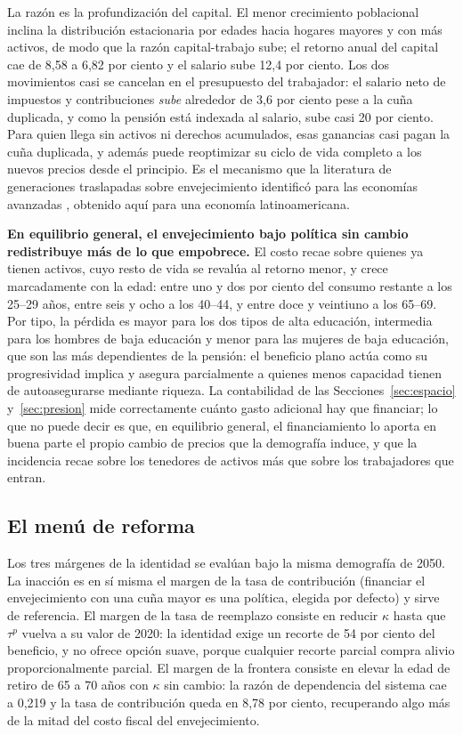 \documentclass[12pt, letterpaper]{article}
\begin{document}
La razón es la profundización del capital. El menor crecimiento poblacional
inclina la distribución estacionaria por edades hacia hogares mayores y con más
activos, de modo que la razón capital-trabajo sube; el retorno anual del capital
cae de 8,58 a 6,82 por ciento y el salario sube 12,4 por ciento. Los dos
movimientos casi se cancelan en el presupuesto del trabajador: el salario neto de
impuestos y contribuciones \emph{sube} alrededor de 3,6 por ciento pese a la cuña
duplicada, y como la pensión está indexada al salario, sube casi 20 por ciento.
Para quien llega sin activos ni derechos acumulados, esas ganancias
casi pagan la cuña duplicada, y además puede reoptimizar su ciclo de vida completo
a los nuevos precios desde el principio. Es el mecanismo que la literatura de
generaciones traslapadas sobre envejecimiento identificó para las economías
avanzadas \citep{krueger2007}, obtenido aquí para una economía latinoamericana.

\textbf{En equilibrio general, el envejecimiento bajo política sin cambio
redistribuye más de lo que empobrece.} El costo
recae sobre quienes ya tienen activos, cuyo resto de vida se revalúa al retorno
menor, y crece marcadamente con la edad: entre uno y dos por ciento del consumo
restante a los 25--29 años, entre seis y ocho a los 40--44, y entre doce y
veintiuno a los 65--69. Por tipo, la pérdida es mayor para los dos tipos de alta
educación, intermedia para los hombres de baja educación y menor para las mujeres
de baja educación, que son las más dependientes de la pensión: el beneficio plano
actúa como su progresividad implica y asegura parcialmente a quienes menos
capacidad tienen de autoasegurarse mediante riqueza. La contabilidad de las
Secciones~\ref{sec:espacio} y~\ref{sec:presion} mide correctamente cuánto gasto
adicional hay que financiar; lo que no puede decir es que, en equilibrio general,
el financiamiento lo aporta en buena parte el propio cambio de precios que la
demografía induce, y que la incidencia recae sobre los tenedores de activos más que
sobre los trabajadores que entran.

\subsection{El menú de reforma}

Los tres márgenes de la identidad se evalúan bajo la misma demografía de 2050. La
inacción es en sí misma el margen de la tasa de contribución (financiar el
envejecimiento con una cuña mayor es una política, elegida por defecto) y sirve de
referencia. El margen de la tasa de reemplazo consiste en reducir $\kappa$
hasta que $\tau^{p}$ vuelva a su valor de 2020: la identidad exige un recorte de
54 por ciento del beneficio, y no ofrece opción suave, porque cualquier recorte
parcial compra alivio proporcionalmente parcial. El margen de la frontera consiste
en elevar la edad de retiro de 65 a 70 años con $\kappa$ sin cambio: la razón de
dependencia del sistema cae a 0,219 y la tasa de contribución queda en 8,78 por
ciento, recuperando algo más de la mitad del costo fiscal del envejecimiento.
\end{document}
